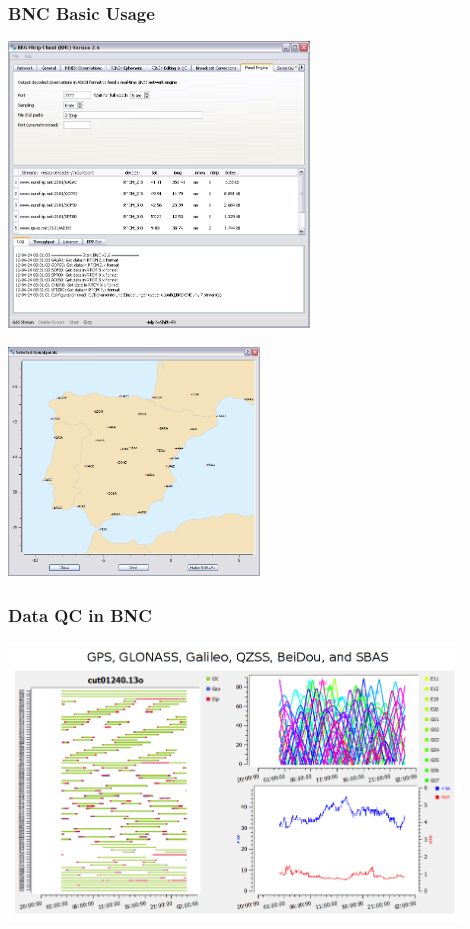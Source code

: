 \documentclass[10pt]{beamer}
\begin{document}
\begin{frame}
\frametitle{BNC Basic Usage}
\includegraphics[width=0.6\textwidth,angle=0]{screenshot12.png}

\vspace*{-4cm}
\hspace*{4cm}
\includegraphics[width=0.5\textwidth,angle=0]{screenshot24.png}
\end {frame}


\begin{frame}
  \frametitle{Data QC in BNC}
  \begin{center}
    \includegraphics[width=0.9\textwidth,angle=0]{bnc_qc2.png}
  \end{center}
\end {frame}
\end{document}

